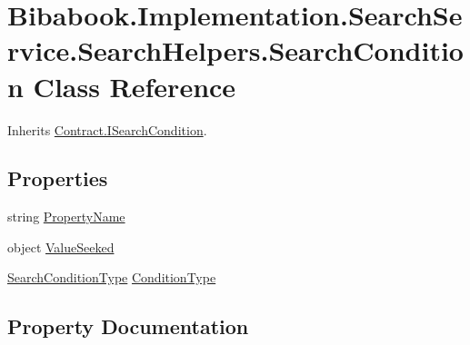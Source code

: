 \hypertarget{class_bibabook_1_1_implementation_1_1_search_service_1_1_search_helpers_1_1_search_condition}{}\section{Bibabook.\+Implementation.\+Search\+Service.\+Search\+Helpers.\+Search\+Condition Class Reference}
\label{class_bibabook_1_1_implementation_1_1_search_service_1_1_search_helpers_1_1_search_condition}


Inherits \hyperlink{interface_contract_1_1_i_search_condition}{Contract.\+I\+Search\+Condition}.

\subsection*{Properties}
\begin{DoxyCompactItemize}
\item 
string \hyperlink{class_bibabook_1_1_implementation_1_1_search_service_1_1_search_helpers_1_1_search_condition_a27ffc146a7b383bc22fddd9038b19535}{Property\+Name}
\item 
object \hyperlink{class_bibabook_1_1_implementation_1_1_search_service_1_1_search_helpers_1_1_search_condition_a03fb0b6daa71f2dc653180d8618bf4ae}{Value\+Seeked}
\item 
\hyperlink{namespace_contract_1_1_enums_aaec9cf8d7ed5b1eb4f9b9252c3ac10aa}{Search\+Condition\+Type} \hyperlink{class_bibabook_1_1_implementation_1_1_search_service_1_1_search_helpers_1_1_search_condition_ad687a38f2ac1b652ba4f621fa3bbd983}{Condition\+Type}
\end{DoxyCompactItemize}


\subsection{Property Documentation}
\hypertarget{class_bibabook_1_1_implementation_1_1_search_service_1_1_search_helpers_1_1_search_condition_ad687a38f2ac1b652ba4f621fa3bbd983}{}
